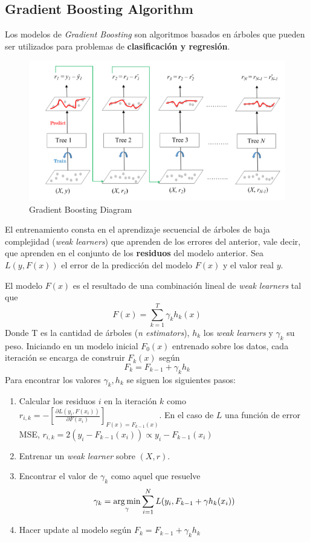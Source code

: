 \subsection{Gradient Boosting Algorithm}

Los modelos de \textit{Gradient Boosting} son algoritmos basados en árboles que pueden ser utilizados para problemas de \textbf{clasificación y regresión}. 

\begin{figure}[H]
    \center
    \includegraphics[scale=0.5]{notebooks/ML/img/gbc_diagram.png}
    \caption{Gradient Boosting Diagram}
\end{figure}

El entrenamiento consta en el aprendizaje secuencial de árboles de baja complejidad (\textit{weak learners}) que aprenden de los errores del anterior, vale decir, que aprenden en el conjunto de los \textbf{residuos} del modelo anterior. Sea $L(y , F(x))$ el error de la predicción del modelo $F(x)$ y el valor real $y$. 

El modelo $F(x)$ es el resultado de una combinación lineal de \textit{weak learners} tal que 
$$ 
F(x) = \sum_{k=1}^T \gamma_k h_k(x)
$$
Donde T es la cantidad de árboles (\textit{n estimators}), $h_k$ los  \textit{weak learners} y $\gamma_k$ su peso. Iniciando en un modelo inicial $F_0(x)$ entrenado sobre los datos, cada iteración se encarga de construir $F_{k}(x)$ según 
$$ 
F_{k} = F_{k-1} + \gamma_{k}h_{k}
$$
Para encontrar los valores $\gamma_{k} , h_{k}$ se siguen los siguientes pasos: 
\begin{enumerate}
    \item Calcular los residuos $i$ en la iteración $k$ como $r_{i,k} = - \left [ \frac{\partial L(y_i, F(x_i))}{\partial F(x_i)} \right ]_{F(x) = F_{k-1}(x)}$. En el caso de $L$ una función de error MSE, $r_{i,k} = 2(y_i - F_{k-1}(x_i)) \propto y_i - F_{k-1}(x_i)$
    \item Entrenar un \textit{weak learner} sobre $(X, r)$.
    \item Encontrar el valor de $\gamma_k$ como aquel que resuelve 
    $$ 
    \gamma_k = \operatorname*{arg\,min}_{\gamma}\sum_{i=1}^N L(y_i , F_{k-1} + \gamma h_{k}(x_i))
    $$
    \item Hacer update al modelo según $F_{k} = F_{k-1} + \gamma_{k}h_{k}$
\end{enumerate}

